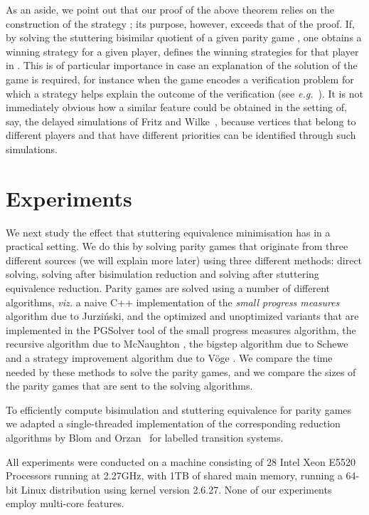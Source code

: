 \documentclass[a4paper]{llncs}
\newcommand{\eg}{\textit{e.g.}\xspace}
\newcommand{\viz}{\textit{viz.}\xspace}
\begin{document}
As an aside, we point out that our proof of the above theorem relies
on the construction of the strategy ; its purpose, however,
exceeds that of the proof. If, by solving the stuttering bisimilar
quotient of a given parity game , one obtains a winning strategy
 for a given player,  defines the winning strategies
for that player in . This is of particular importance in case an
explanation of the solution of the game is required, for instance when the game
encodes a verification problem for which a strategy helps explain the
outcome of the verification (see \eg~\cite{SS:98}). It is not immediately
obvious how a similar feature could be obtained in the setting of, say,
the delayed simulations of Fritz and Wilke~\cite{FW:06}, because vertices
that belong to different players and that have different priorities can be
identified through such simulations.


\section{Experiments}
\label{sec:experiments}

We next study the effect that stuttering equivalence minimisation has in a 
practical setting. We do this by solving parity games that originate from three
different sources (we will explain more later) using three
different methods: direct solving, solving after bisimulation reduction and
solving after stuttering equivalence reduction. Parity games
are solved using a number of different algorithms, \viz a naive C++ implementation of the
\emph{small progress measures} algorithm due to Jurzi{\'n}ski, and the optimized
and unoptimized variants that are implemented in the PGSolver tool \cite{FL:09} 
of the small progress measures algorithm, the recursive algorithm due to 
McNaughton \cite{McN:93}, the bigstep algorithm due to Schewe \cite{Sch:07}
and a strategy improvement algorithm due to V{\"o}ge \cite{VJ:00}.
We compare the time needed by these methods to solve the parity games, and
we compare the sizes of the parity games that are sent to the solving algorithms.

To efficiently compute bisimulation and stuttering equivalence for parity
games we ad{\color{red}a}pted a single-threaded implementation of the corresponding
reduction algorithms by Blom and Orzan~\cite{BO:03} for labelled
transition systems.

All experiments were conducted on a machine consisting of 28 
Intel\textregistered{} Xeon\textregistered{} E5520 Processors running at 
2.27GHz, with 1TB of shared main memory, running a 64-bit Linux distribution 
using kernel version 2.6.27. None of our experiments employ multi-core features.
\end{document}
